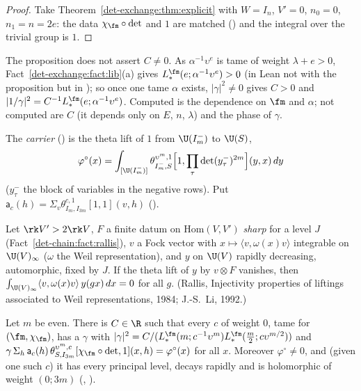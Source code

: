 \begin{proof}
Take Theorem~\ref{det-exchange:thm:explicit} with $W=I_n$, $V'=0$, $n_0=0$, $n_1=n=2e$: the data $\chi_\fm\circ\det$ and
$1$ are matched () and the integral over the trivial group is $1$.
\end{proof}

The proposition does not assert $C\ne0$. As $\alpha^{-1}\upsilon^e$ is tame of weight $\lambda+e>0$,
Fact~\ref{det-exchange:fact:lib}(a) gives $L_*^{\fm}(e;\alpha^{-1}\upsilon^e)>0$ (in Lean not with the
proposition but in ); so once one tame
$\alpha$ exists, $|\gamma|^2\ne0$ gives $C>0$ and $|1/\gamma|^2=C^{-1}L_*^{\fm}(e;\alpha^{-1}\upsilon^e)$.
Computed is the dependence on $\fm$ and $\alpha$; not computed are $C$ (it depends only on $E$, $n$, $\lambda$)
and the phase of $\gamma$.

The \emph{carrier} () is the theta lift of $1$ from $\U(I_m^-)$ to $\U(S)$,
\[
\varphi^\circ(x)=\int_{[\U(I_m^-)]}\theta^{\upsilon^m,1}_{I_m^-,S}\Bigl[1,\prod_\tau\det(y^-_\tau)^{2m}\Bigr](y,x)\,dy
\]
($y^-_\tau$ the block of variables in the negative rows). Put
$\mathsf a_c(h)=\Sigma_v\theta^{c,1}_{I_m,I_{3m}}[1,1](v,h)$ ().

\begin{fact}
\label{ol-compare:fact:rallis}
Let $\rk V'>2\rk V$, $F$ a finite datum on $\mathrm{Hom}(V,V')$ \emph{sharp} for a level $J$
(Fact~\ref{det-chain:fact:rallis}),
$v$ a Fock vector with $x\mapsto\langle v,\omega(x)v\rangle$ integrable on $\U(V)_\infty$ ($\omega$ the Weil representation), and $y$
on $\U(V)$ rapidly decreasing, automorphic, fixed by $J$. If the theta lift of $y$ by $v\otimes F$ vanishes, then $\int_{\U(V)_\infty}\langle v,\omega(x)v\rangle\,y(gx)\,dx=0$ for all
$g$. (Rallis, Injectivity properties of liftings associated to Weil representations, 1984;
J.-S.~Li, 1992.)
\end{fact}

\begin{proposition}
\label{ol-compare:prop:carrier}
Let $m$ be even. There is $C\in\R$ such that every $c$ of weight $0$, tame for $(\fm,\chi_\fm)$, has a
$\gamma$ with $|\gamma|^2=C/(L_*^{\fm}(m;c^{-1}\upsilon^m)L_*^{\fm}(\frac m2;c\upsilon^{m/2}))$ and
$\gamma\,\Sigma_h\,\mathsf a_c(h)\,\theta^{\upsilon^m,c}_{S,I_{3m}}[\chi_\fm\circ\det,1](x,h)=\varphi^\circ(x)$ for
all $x$. Moreover $\varphi^\circ\ne0$, and (given one such $c$) it has every principal level, decays
rapidly and is holomorphic of weight $(0;3m)$ (,
).
\end{proposition}

